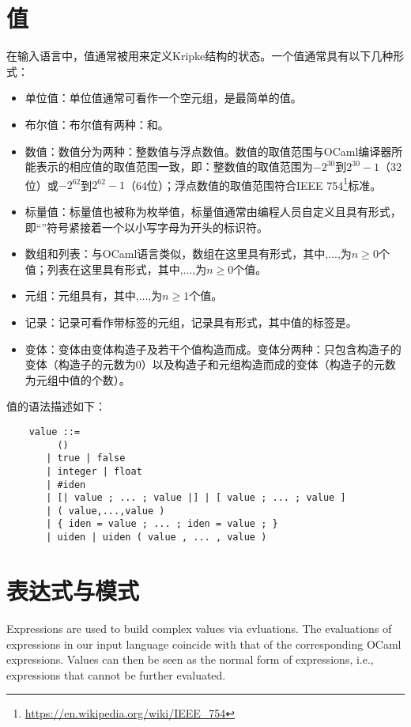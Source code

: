 \section{值}
在输入语言中，值通常被用来定义Kripke结构的状态。一个值通常具有以下几种形式：
\begin{itemize}
	\item 单位值：单位值\code{()}通常可看作一个空元组，是最简单的值。
	\item 布尔值：布尔值有两种：和。
	\item 数值：数值分为两种：整数值与浮点数值。数值的取值范围与OCaml编译器所能表示的相应值的取值范围一致，即：整数值的取值范围为$-2^{30}$到$2^{30}-1$（32位）或$-2^{62}$到$2^{62}-1$（64位）；浮点数值的取值范围符合IEEE 754\footnote{\url{https://en.wikipedia.org/wiki/IEEE_754}}标准。
	\item 标量值：标量值也被称为枚举值，标量值通常由编程人员自定义且具有形式，即“\code{\#}”符号紧接着一个以小写字母为开头的标识符。
	\item 数组和列表：与OCaml语言类似，数组在这里具有\code{[|v1,...,vn|]}形式，其中,...,为$n\ge 0$个值；列表在这里具有\code{[v1,...,vn]}形式，其中,...,为$n\ge 0$个值。
	\item 元组：元组具有，其中,...,为$n\ge 1$个值。
	\item 记录：记录可看作带标签的元组，记录具有形式，其中值的标签是。
	\item 变体：变体由变体构造子及若干个值构造而成。变体分两种：只包含构造子的变体（构造子的元数为0）以及构造子和元组构造而成的变体（构造子的元数为元组中值的个数）。
\end{itemize}
值的语法描述如下：
\begin{center}
	\begin{verbatim}
	value ::= 
	     ()
	   | true | false
	   | integer | float
	   | #iden
	   | [| value ; ... ; value |] | [ value ; ... ; value ]
	   | ( value,...,value )
	   | { iden = value ; ... ; iden = value ; }
	   | uiden | uiden ( value , ... , value )
	\end{verbatim}
\end{center}
\section{表达式与模式}
Expressions are used to build complex values via evluations. The evaluations of expressions in our input language coincide with that of the corresponding OCaml expressions. Values can then be seen as the normal form of expressions, i.e., expressions that cannot be further evaluated.

